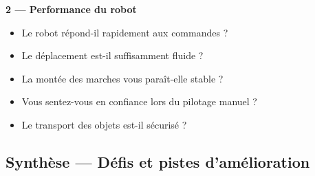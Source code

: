 \documentclass[12pt,a4paper]{article}
\begin{document}
\textbf{2 — Performance du robot}
\begin{itemize}
    \item Le robot répond-il rapidement aux commandes ?
    \item Le déplacement est-il suffisamment fluide ?
    \item La montée des marches vous paraît-elle stable ?
    \item Vous sentez-vous en confiance lors du pilotage manuel ?
    \item Le transport des objets est-il sécurisé ?
\end{itemize}



\subsection*{Synthèse — Défis et pistes d’amélioration}
\end{document}
